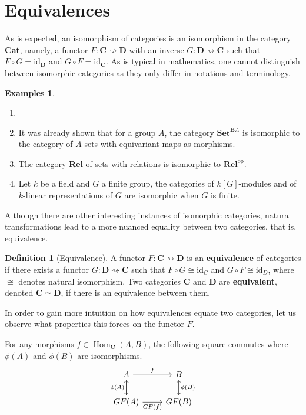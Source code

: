 \documentclass{article}
\theoremstyle{definition}
\newtheorem{defn}[thm]{Definition}
\newtheorem{exmps}[thm]{Examples}
\theoremstyle{remark}
\DeclareMathOperator{\Hom}{Hom}
\newcommand{\id}{\text{id}}
\newcommand{\op}[1]{#1^{\text{op}}}
\begin{document}
\section{Equivalences}
As is expected, an isomorphism of categories is an isomorphism in the category \textbf{Cat}, namely, a functor $F:\mathbf{C}\rightsquigarrow \mathbf{D}$ with an inverse $G:\mathbf{D}\rightsquigarrow \mathbf{C}$ such that $F \circ G = \id_{\mathbf{D}}$ and $G\circ F = \id_{\mathbf{C}}$. As is typical in mathematics, one cannot distinguish between isomorphic categories as they only differ in notations and terminology.
\begin{exmps}
	\begin{enumerate}
		\item[]
		\item It was already shown that for a group $A$, the category $\textbf{Set}^{\mathbf{B}A}$ is isomorphic to the category of $A$-sets with equivariant maps as morphisms.
		\item The category \textbf{Rel} of sets with relations is isomorphic to $\op{\textbf{Rel}}$.
		\item Let $k$ be a field and $G$ a finite group, the categories of $k[G]$-modules and of $k$-linear representations of $G$ are isomorphic when $G$ is finite.
	\end{enumerate}
\end{exmps}
 Although there are other interesting instances of isomorphic categories, natural transformations lead to a more nuanced equality between two categories, that is, equivalence.
\begin{defn}[Equivalence]
	A functor $F:\mathbf{C}\rightsquigarrow \mathbf{D}$ is an \textbf{equivalence} of categories if there exists a functor $G:\mathbf{D}\rightsquigarrow \mathbf{C}$ such that $F\circ G\cong \id_{C}$ and $G\circ F \cong \id_{D}$, where $\cong$ denotes natural isomorphism. Two categories $\mathbf{C}$ and $\mathbf{D}$ are \textbf{equivalent}, denoted $\mathbf{C} \simeq \mathbf{D}$, if there is an equivalence between them.
\end{defn}
In order to gain more intuition on how equivalences equate two categories, let us observe what properties this forces on the functor $F$.

For any morphisms $f \in \Hom_{\mathbf{C}}(A,B)$, the following square commutes where $\phi(A)$ and $\phi(B)$ are isomorphisms.
\begin{equation}\label{diag-bijfromequiv}
\begin{tikzcd}
A \arrow[r, "f"] \arrow[d]                                 & B \arrow[d]                            \\
GF(A) \arrow[r, "GF(f)"'] \arrow[u, "\phi(A)"] & GF(B) \arrow[u, "\phi(B)"']
\end{tikzcd}
\end{equation}
\end{document}
